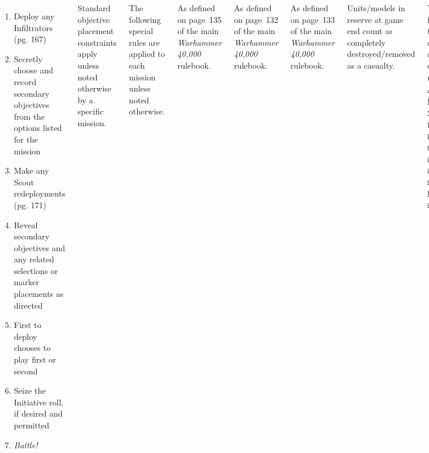 \begin{columns}
\begin{enumerate}
\item Deploy any Infiltrators (pg. 167)

\item Secretly choose and record secondary objectives from the options
  listed for the mission

\item Make any Scout redeployments (pg. 171)

\item Reveal secondary objectives and any related selections or marker
  placements as directed

\item First to deploy chooses to play first or second

\item Seize the Initiative roll, if desired and permitted

\item \emph{Battle!}
\end{enumerate}

\bigskip\noindent Standard objective placement constraints apply
unless noted otherwise by a specific mission.

\columnbreak
{}

The following special rules are applied to each mission unless noted
otherwise.

 As defined on page~135 of the main
\emph{Warhammer 40,000} rulebook.

 As defined on page~132 of
the main \emph{Warhammer 40,000} rulebook.

 As defined on page~133 of
the main \emph{Warhammer 40,000} rulebook.

  Units/models in reserve at game end count
as completely destroyed/removed as a casualty.


The following tertiary objectives apply in each mission.
\underline{At most~5 total victory points may be earned}
\underline{by a player across all of the tertiary objectives.}

\begin{itemize}
\item \textit{Slay the Warlord.}  If your opponent's Warlord or a Lord
  of War character of theirs has been removed as a casualty or is
  falling back at the end of the game, score~2 victory points.


\end{itemize}
\end{columns}
